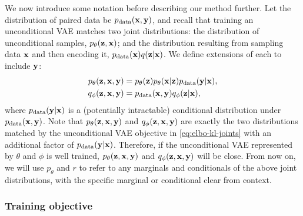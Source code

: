We now introduce some notation before describing our method further. Let the
distribution of paired data be $p_{\rm{data}}({\mathbf{x}}, {\mathbf{y}})$, and recall that
training an unconditional VAE matches two joint distributions: the distribution
of unconditional samples, $p_\theta({\mathbf{z}}, {\mathbf{x}})$; and the distribution
resulting from sampling data ${\mathbf{x}}$ and then encoding it, $p_{\rm{data}}({\mathbf{x}})q({\mathbf{z}}|{\mathbf{x}})$.
We define
extensions of each to include ${\mathbf{y}}$:
\begin{align}
  p_\theta({\mathbf{z}}, {\mathbf{x}}, {\mathbf{y}}) &= p_\theta({\mathbf{z}})p_\theta({\mathbf{x}}|{\mathbf{z}})p_{\rm{data}}({\mathbf{y}}|{\mathbf{x}}), \label{eq:pmodel} \\
  q_\phi({\mathbf{z}}, {\mathbf{x}}, {\mathbf{y}}) &= p_{\rm{data}}({\mathbf{x}}, {\mathbf{y}})q_\phi({\mathbf{z}}|{\mathbf{x}}), \label{eq:r}
\end{align}
where $p_{\rm{data}}({\mathbf{y}}|{\mathbf{x}})$ is a (potentially intractable) conditional
distribution under $p_{\rm{data}}({\mathbf{x}}, {\mathbf{y}})$.
%
Note that $p_\theta({\mathbf{z}}, {\mathbf{x}}, {\mathbf{y}})$ and $q_\phi({\mathbf{z}}, {\mathbf{x}}, {\mathbf{y}})$ are exactly the two distributions matched by the unconditional VAE
objective in \cref{eq:elbo-kl-joints} with an additional factor of
$p_{\rm{data}}({\mathbf{y}}|{\mathbf{x}})$.
%
Therefore, if the unconditional VAE represented by $\theta$ and $\phi$ is well
trained, $p_\theta({\mathbf{z}}, {\mathbf{x}}, {\mathbf{y}})$ and
$q_\phi({\mathbf{z}}, {\mathbf{x}}, {\mathbf{y}})$ will be close. From now on, we will use
$p_\theta$ and $r$ to refer to any marginals and conditionals of the above
joint distributions, with the specific marginal or conditional clear from
context.

\subsubsection{Training objective}

